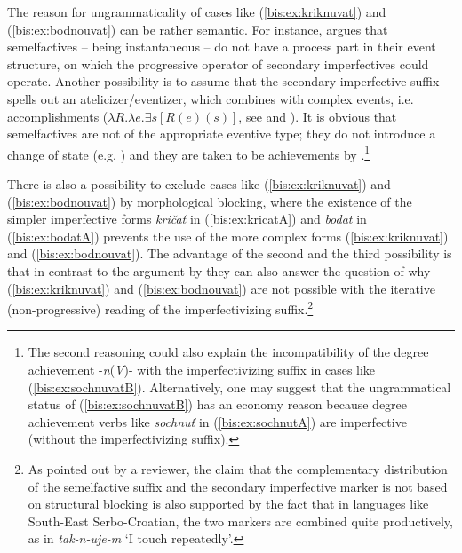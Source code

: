 \documentclass[output=paper]{langscibook}
\begin{document}
\noindent The reason for ungrammaticality of cases like (\ref{bis:ex:kriknuvat}) and (\ref{bis:ex:bodnouvat}) can be rather semantic. For instance, \citet{Jablonska2007} argues that semelfactives – being instantaneous – do not have a process part in their event structure, on which the progressive operator of secondary imperfectives could operate. Another possibility is to assume that the secondary imperfective suffix spells out an atelicizer/eventizer, which combines with complex events, i.e. accomplishments ($λR.λe.∃s[R(e)(s)]$, see \citealt{Lazorczyk2010} and \citealt{Tatevosov2015Slavic}). It is obvious that semelfactives are not of the appropriate eventive type; they do not introduce a change of state (e.g. \citealt{Smith1991}) and they are taken to be achievements by \citet{Vendler1957}.\footnote{The second reasoning could also explain the incompatibility of the degree achievement -\textit{n}(\textit{V})- with the imperfectivizing suffix in cases like (\ref{bis:ex:sochnuvatB}). Alternatively, one may suggest that the ungrammatical status of (\ref{bis:ex:sochnuvatB}) has an economy reason because degree achievement verbs like \textit{sochnuť} in (\ref{bis:ex:sochnutA}) are imperfective (without the imperfectivizing suffix).
\ea
{}
\z
\z
}

There is also a possibility to exclude cases like (\ref{bis:ex:kriknuvat}) and (\ref{bis:ex:bodnouvat}) by morphological blocking, where the existence of the simpler imperfective forms \textit{kričať} in (\ref{bis:ex:kricatA}) and \textit{bodat} in (\ref{bis:ex:bodatA}) prevents the use of the more complex forms (\ref{bis:ex:kriknuvat}) and (\ref{bis:ex:bodnouvat}). The advantage of the second and the third possibility is that in contrast to the argument by \citet{Jablonska2007} they can also answer the question of why (\ref{bis:ex:kriknuvat}) and (\ref{bis:ex:bodnouvat}) are not possible with the iterative (non-progressive) reading of the imperfectivizing suffix.\footnote{As pointed out by a reviewer, the claim that the complementary distribution of the semelfactive suffix and the secondary imperfective marker is not based on structural blocking is also supported by the fact that in languages like South-East Serbo-Croatian, the two markers are combined quite productively, as in \textit{tak-n-uje-m} ‘I touch repeatedly’.}			
\end{document}
